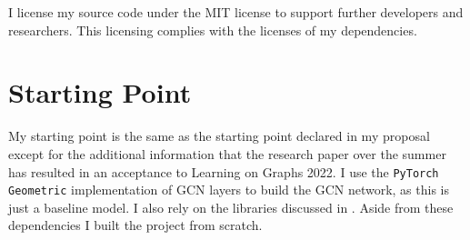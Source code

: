 I license my source code under the MIT license to support further developers and researchers.
This licensing complies with the licenses of my dependencies.


\section{Starting Point}

My starting point is the same as the starting point declared in my proposal except for the additional information that the research paper over the summer has resulted in an acceptance to Learning on Graphs 2022.
I use the \texttt{PyTorch Geometric} implementation of GCN layers to build the GCN network, as this is just a baseline model. I also rely on the libraries discussed in .
Aside from these dependencies I built the project from scratch.


